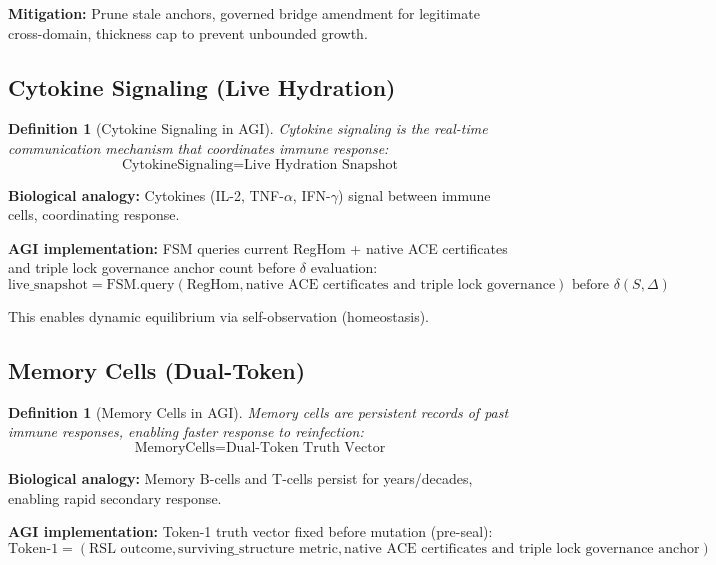 \documentclass[11pt,a4paper]{article}
\newtheorem{definition}[theorem]{Definition}
\begin{document}
\textbf{Mitigation:} Prune stale anchors, governed bridge amendment for legitimate cross-domain, thickness cap to prevent unbounded growth.

\subsection{Cytokine Signaling (Live Hydration)}

\begin{definition}[Cytokine Signaling in AGI]
Cytokine signaling is the real-time communication mechanism that coordinates immune response:
\begin{equation}
\text{CytokineSignaling} = \text{Live Hydration Snapshot}
\end{equation}
\end{definition}

\textbf{Biological analogy:} Cytokines (IL-2, TNF-$\alpha$, IFN-$\gamma$) signal between immune cells, coordinating response.

\textbf{AGI implementation:} FSM queries current RegHom + native ACE certificates and triple lock governance anchor count before $\delta$ evaluation:
\begin{equation}
\text{live\_snapshot} = \text{FSM.query}(\text{RegHom}, \text{native ACE certificates and triple lock governance}) \text{ before } \delta(S, \Delta)
\end{equation}

This enables dynamic equilibrium via self-observation (homeostasis).

\subsection{Memory Cells (Dual-Token)}

\begin{definition}[Memory Cells in AGI]
Memory cells are persistent records of past immune responses, enabling faster response to reinfection:
\begin{equation}
\text{MemoryCells} = \text{Dual-Token Truth Vector}
\end{equation}
\end{definition}

\textbf{Biological analogy:} Memory B-cells and T-cells persist for years/decades, enabling rapid secondary response.

\textbf{AGI implementation:} Token-1 truth vector fixed before mutation (pre-seal):
\begin{equation}
\text{Token-1} = (\text{RSL outcome}, \text{surviving\_structure metric}, \text{native ACE certificates and triple lock governance anchor})
\end{equation}
\end{document}
